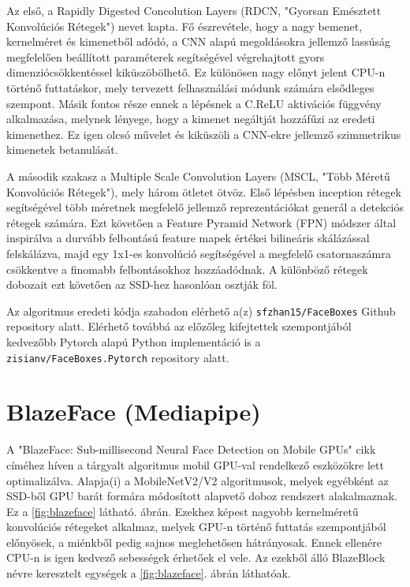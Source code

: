 Az első, a Rapidly Digested Concolution Layers (RDCN, "Gyorsan Emésztett Konvolúciós Rétegek") nevet kapta. Fő észrevétele, hogy a nagy bemenet, kernelméret és kimenetből adódó, a CNN alapú megoldásokra jellemző lassúság megfelelően beállított paraméterek segítségével végrehajtott gyors dimenziócsökkentéssel kiküszöbölhető. Ez különösen nagy előnyt jelent CPU-n történő futtatáskor, mely tervezett felhasználási módunk számára elsődleges szempont. Másik fontos része ennek a lépésnek a C.ReLU \cite{shang_understanding_2016} aktivációs függvény alkalmazása, melynek lényege, hogy a kimenet negáltját hozzáfűzi az eredeti kimenethez. Ez igen olcsó művelet és kiküszöli a CNN-ekre jellemző szimmetrikus kimenetek betanulását.

A második szakasz a Multiple Scale Convolution Layers (MSCL, "Több Méretű Konvolúciós Rétegek"), mely három ötletet ötvöz. Első lépésben inception \cite{szegedy_going_2015} rétegek segítségével több méretnek megfelelő jellemző reprezentációkat generál a detekciós rétegek számára. Ezt követően a Feature Pyramid Network (FPN) \cite{lin_feature_2017} módszer által inspirálva a durvább felbontású feature mapek értékei bilineáris skálázással felskálázva, majd egy 1x1-es konvolúció segítségével a megfelelő csatornaszámra csökkentve a finomabb felbontásokhoz hozzáadódnak. A különböző rétegek dobozait ezt követően az SSD-hez \cite{liu_ssd_2016} hasonlóan osztják föl.

Az algoritmus eredeti kódja szabadon elérhető a(z) \lstinline{sfzhan15/FaceBoxes} \cite{zhang_faceboxes_2021} Github repository alatt. Elérhető továbbá az előzőleg kifejtettek szempontjából kedvezőbb Pytorch alapú Python implementáció is a \lstinline{zisianv/FaceBoxes.Pytorch} \cite{wong_faceboxes_2021} repository alatt.

\section{BlazeFace (Mediapipe)}
A "BlazeFace: Sub-millisecond Neural Face Detection on Mobile GPUs"\cite{bazarevsky_blazeface_2019} cikk címéhez híven a tárgyalt algoritmus mobil GPU-val rendelkező eszközökre lett optimalizálva. Alapja(i) a MobileNetV2/V2 \cite{howard_mobilenets_2017, sandler_mobilenetv2_2019} algoritmusok, melyek egyébként az SSD-ből GPU barát formára módosított alapvető doboz rendszert alakalmaznak. Ez a \ref{fig:blazeface} látható. ábrán. Ezekhez képest nagyobb kernelméretű konvolúciós rétegeket alkalmaz, melyek GPU-n történő futtatás szempontjából előnyösek, a miénkből pedig sajnos meglehetősen hátrányosak. Ennek ellenére CPU-n is igen kedvező sebességek érhetőek el vele. Az ezekből álló BlazeBlock névre keresztelt egységek a \ref{fig:blazeface}. ábrán láthatóak.

